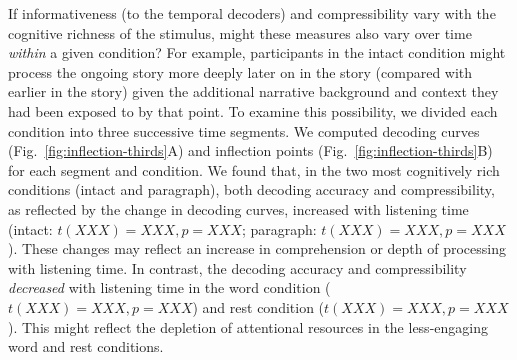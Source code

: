 \documentclass[english, 11pt]{article}
\begin{document}
If informativeness (to the temporal decoders) and compressibility vary with the
cognitive richness of the stimulus, might these measures also vary over time
\textit{within} a given condition? For example, participants in the intact
condition might process the ongoing story more deeply later on in the story
(compared with earlier in the story) given the additional narrative background
and context they had been exposed to by that point. To examine this
possibility, we divided each condition into three successive time segments. We
computed decoding curves (Fig.~\ref{fig:inflection-thirds}A) and inflection
points (Fig.~\ref{fig:inflection-thirds}B) for each segment and condition. We
found that, in the two most cognitively rich conditions (intact and paragraph),
both decoding accuracy and compressibility, as reflected by the change in
decoding curves, increased with listening time (intact: $t(XXX) = XXX, p =
XXX$; paragraph: $t(XXX) = XXX, p = XXX$). These changes may reflect an
increase in comprehension or depth of processing with listening time. In
contrast, the decoding accuracy and compressibility \textit{decreased} with
listening time in the word condition ($t(XXX) = XXX, p = XXX$) and rest
condition ($t(XXX) = XXX, p = XXX$). This might reflect the depletion of
attentional resources in the less-engaging word and rest conditions.
\end{document}

